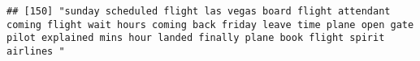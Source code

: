 \documentclass[
]{article}
\begin{document}
\begin{verbatim}
## [150] "sunday scheduled flight las vegas board flight attendant coming flight wait hours coming back friday leave time plane open gate pilot explained mins hour landed finally plane book flight spirit airlines "                                                                                                                                                                                                                                                                                                                                                                                                                                                                                                                                                                                                                                                                                                                                                                                                                                                                                                                                                                                                                                                                                                                                                                                                                                                                                                                                                                                                                                                                                                                                                                                   

\end{verbatim}
\end{document}
